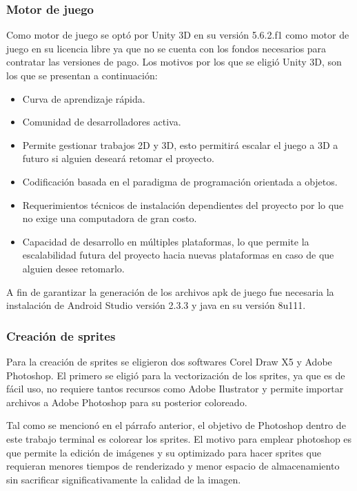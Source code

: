 	\subsubsection{Motor de juego}
Como motor de juego se optó por Unity 3D en su versión 5.6.2.f1 como 
motor de juego en su licencia libre ya que no se cuenta con los fondos necesarios 
para contratar las versiones de pago. Los motivos por los que se eligió Unity 3D,
 son los que se presentan a continuación:
        \begin{itemize}
			\item Curva de aprendizaje rápida.
			\item Comunidad de desarrolladores activa.
			\item Permite gestionar trabajos 2D y 3D, esto permitirá escalar el juego 
                a 3D a futuro si alguien deseará retomar el proyecto.
			\item Codificación basada en el paradigma de programación orientada a
			objetos.
			\item Requerimientos técnicos de instalación dependientes del proyecto por
			lo que no exige una computadora de gran costo.
			\item Capacidad de desarrollo en múltiples plataformas, lo que permite la
                 escalabilidad futura del proyecto hacia nuevas plataformas en caso de
                 que alguien desee retomarlo.
        \end{itemize} 
A fin de garantizar la generación de los archivos apk de juego fue necesaria la instalación de Android Studio versión 2.3.3 y java en su versión  8u111.
	\subsubsection{Creación de sprites}
Para la creación de sprites se eligieron dos softwares Corel Draw X5 y Adobe Photoshop. El primero se eligió para la vectorización de los sprites, ya que es de fácil uso, no requiere tantos recursos como Adobe Ilustrator y permite importar archivos a Adobe Photoshop para su posterior coloreado.
\\
\par
Tal como se mencionó en el párrafo anterior, el objetivo de Photoshop dentro de
 este trabajo terminal es colorear los sprites. El motivo para emplear photoshop
 es que permite la edición de imágenes y su optimizado para hacer sprites que 
 requieran menores tiempos de renderizado y menor espacio de almacenamiento sin
 sacrificar significativamente la calidad de la imagen.
